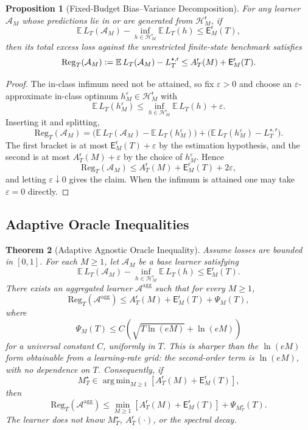 \documentclass[12pt]{article}
\newtheorem{theorem}{Theorem}[section]
\newtheorem{proposition}[theorem]{Proposition}
\theoremstyle{definition}
\DeclareMathOperator*{\argmin}{arg\,min}
\newcommand{\eqdef}{\vcentcolon=}
\newcommand{\Hcal}{\mathcal H}
\newcommand{\Reg}{\mathrm{Reg}}
\newcommand{\Est}{\mathsf E}
\newcommand{\Aapp}{A_T}
\newcommand{\PsiAgg}{\Psi}
\begin{document}
\begin{proposition}[Fixed-Budget Bias--Variance Decomposition]
\label{prop:fixed}
For any learner $\mathcal A_M$ whose predictions lie in or are generated from
$\Hcal_M^{\mathsf r}$, if
\[
\mathbb E\,L_T(\mathcal A_M)
-
\inf_{h\in\Hcal_M^{\mathsf r}}
\mathbb E\,L_T(h)
\le
\Est_M^{\mathsf r}(T),
\]
then its total excess loss against the unrestricted finite-state benchmark
satisfies
\[
\Reg_T(\mathcal A_M)
\eqdef
\mathbb E\,L_T(\mathcal A_M)-L_T^{\star,\mathsf r}
\le
\Aapp^{\mathsf r}(M)+\Est_M^{\mathsf r}(T).
\]
\end{proposition}

\begin{proof}
The in-class infimum need not be attained, so fix $\varepsilon>0$ and choose an
$\varepsilon$-approximate in-class optimum
$h_M^\varepsilon\in\Hcal_M^{\mathsf r}$ with
\[
\mathbb E\,L_T(h_M^\varepsilon)
\le
\inf_{h\in\Hcal_M^{\mathsf r}}\mathbb E\,L_T(h)+\varepsilon .
\]
Inserting it and splitting,
\[
\Reg_T(\mathcal A_M)
=
\bigl(
\mathbb E\,L_T(\mathcal A_M)-\mathbb E\,L_T(h_M^\varepsilon)
\bigr)
+
\bigl(
\mathbb E\,L_T(h_M^\varepsilon)-L_T^{\star,\mathsf r}
\bigr).
\]
The first bracket is at most $\Est_M^{\mathsf r}(T)+\varepsilon$ by the
estimation hypothesis, and the second is at most
$\Aapp^{\mathsf r}(M)+\varepsilon$ by the choice of $h_M^\varepsilon$.  Hence
\[
\Reg_T(\mathcal A_M)
\le
\Aapp^{\mathsf r}(M)+\Est_M^{\mathsf r}(T)+2\varepsilon ,
\]
and letting $\varepsilon\downarrow0$ gives the claim.  When the infimum is
attained one may take $\varepsilon=0$ directly.
\end{proof}

\subsection{Adaptive Oracle Inequalities}
\label{subsec:oracle-adaptive}

\begin{theorem}[Adaptive Agnostic Oracle Inequality]
\label{thm:oracle-agnostic}
Assume losses are bounded in $[0,1]$.  For each $M\ge1$, let
$\mathcal A_M$ be a base learner satisfying
\[
\mathbb E\,L_T(\mathcal A_M)
-
\inf_{h\in\Hcal_M^{\mathsf r}}
\mathbb E\,L_T(h)
\le
\Est_M^{\mathsf r}(T).
\]
There exists an aggregated learner $\mathcal A^{\mathrm{agg}}$ such that for
every $M\ge1$,
\[
\Reg_T(\mathcal A^{\mathrm{agg}})
\le
\Aapp^{\mathsf r}(M)
+
\Est_M^{\mathsf r}(T)
+
\PsiAgg_M(T),
\]
where
\[
\PsiAgg_M(T)
\le
C\left(
\sqrt{T\ln(eM)}
+
\ln(eM)
\right)
\]
for a universal constant $C$, uniformly in $T$.  This is sharper than the
$\ln(eM)$ form obtainable from a learning-rate grid: the
second-order term is $\ln(eM)$, with no dependence on $T$.  Consequently, if
\[
M_T^\star
\in
\argmin_{M\ge1}
\left[
\Aapp^{\mathsf r}(M)+\Est_M^{\mathsf r}(T)
\right],
\]
then
\[
\Reg_T(\mathcal A^{\mathrm{agg}})
\le
\min_{M\ge1}
\left[
\Aapp^{\mathsf r}(M)+\Est_M^{\mathsf r}(T)
\right]
+
\PsiAgg_{M_T^\star}(T).
\]
The learner does not know $M_T^\star$, $\Aapp^{\mathsf r}(\cdot)$, or the
spectral decay.
\end{theorem}
\end{document}
